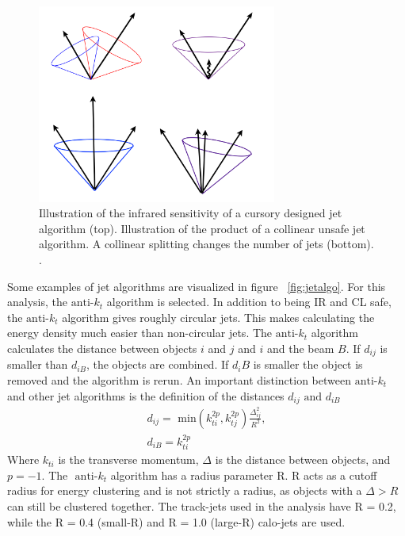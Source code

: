 \begin{figure}[h]
\begin{center}
\includegraphics*[width=0.70\textwidth] {figures/IR_CL_safe}
\caption[Illustration of Infrared and collinear safety]{Illustration of the infrared sensitivity of a cursory designed jet algorithm (top). Illustration of the product of a collinear unsafe jet algorithm. A collinear splitting changes the number of jets (bottom). \cite{Isildak:2013kfa}.}
\label{fig:IR_CL}
\end{center}
\end{figure}

\indent Some examples of jet algorithms are visualized in figure ~\ref{fig:jetalgo}. For this analysis, the ${\text{anti-}k_{t}}$ algorithm is selected. In addition to being IR and CL safe, the ${\text{anti-}k_{t}}$ algorithm gives roughly circular jets. This makes calculating the energy density much easier than non-circular jets. The ${\text{anti-}k_{t}}$ algorithm calculates the distance between objects $i$ and $j$ and $i$ and the beam $B$. If ${d_{ij}}$ is smaller than ${d_{iB}}$, the objects are combined. If ${d_i{B}}$ is smaller the object is removed and the algorithm is rerun. An important distinction between ${\textrm{anti-}k_{t}}$ and other jet algorithms is the definition of the distances ${d_{ij}\text{ and } d_{iB}}$
\begin{equation}
\begin{split}
d_{ij} = \text{ min}(k^{2p}_{ti},k^{2p}_{tj})\frac{\Delta^{2}_{ij}}{R^{2}},\\
d_{iB} = k^{2p}_{ti}
\end{split}
\end{equation}
Where ${k_{ti}}$ is the transverse momentum, ${\Delta}$ is the distance between objects, and ${p=-1}$. The ${\text{ anti-}k_{t}}$ algorithm has a radius parameter R. R acts as a cutoff radius for energy clustering and is not strictly a radius, as objects with a ${\Delta > R}$ can still be clustered together. The track-jets used in the analysis have R = 0.2, while the R = 0.4 (small-R) and R = 1.0 (large-R) calo-jets are used. 
